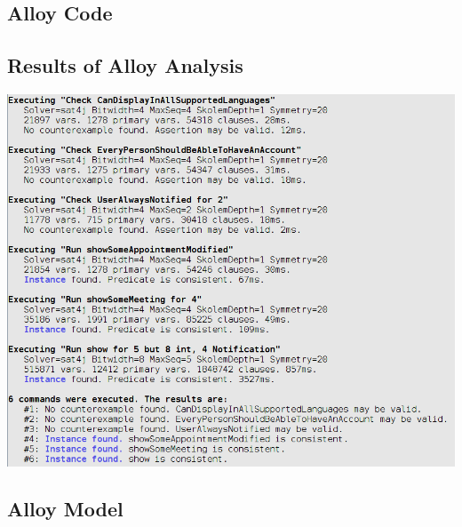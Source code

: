 \subsection{Alloy Code}
\subsection{Results of Alloy Analysis}
\includegraphics[scale=0.5]{Images/alloyRun}
\subsection{Alloy Model}
